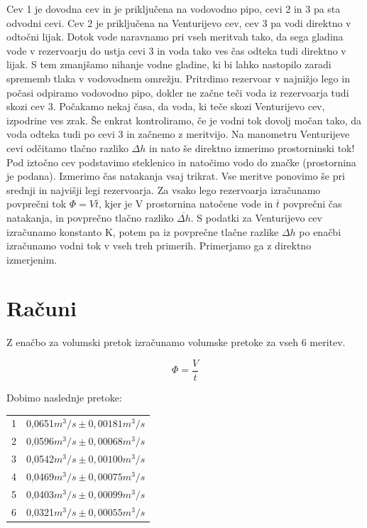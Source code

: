 \documentclass[a4paper]{report}
\begin{document}
Cev 1 je dovodna cev in je priključena na vodovodno pipo, cevi 2 in 3 pa sta odvodni cevi. Cev 2 je priključena na Venturijevo cev, cev 3 pa vodi direktno v odtočni lijak. Dotok vode naravnamo pri vseh meritvah tako, da sega gladina vode v rezervoarju do ustja cevi 3 in voda tako ves čas odteka tudi direktno v lijak. S tem zmanjšamo nihanje vodne gladine, ki bi lahko nastopilo zaradi sprememb tlaka v vodovodnem omrežju. Pritrdimo rezervoar v najnižjo lego in počasi odpiramo vodovodno pipo, dokler ne začne teči voda iz rezervoarja tudi skozi cev 3. Počakamo nekaj časa, da voda, ki teče skozi Venturijevo cev, izpodrine ves zrak. Še enkrat kontroliramo, če je vodni tok dovolj močan tako, da voda odteka tudi po cevi 3 in začnemo z meritvijo. Na manometru Venturijeve cevi odčitamo tlačno razliko $\Delta h$ in nato še direktno izmerimo prostorninski tok! Pod iztočno cev podstavimo steklenico in natočimo vodo do značke (prostornina je podana). Izmerimo čas natakanja vsaj trikrat. Vse meritve ponovimo še pri srednji in najvišji legi rezervoarja. Za vsako lego rezervoarja izračunamo povprečni tok $\Phi = V\overline{t}$, kjer je V prostornina natočene vode in $\overline{t}$ povprečni čas natakanja, in povprečno tlačno razliko $\overline{\Delta h}$. S podatki za Venturijevo cev izračunamo konstanto K, potem pa iz povprečne tlačne razlike $\Delta h$ po enačbi izračunamo vodni tok v vseh treh primerih. Primerjamo ga z direktno izmerjenim.

\chapter*{Računi}
Z enačbo za volumski pretok izračunamo volumske pretoke za vseh 6 meritev.

\[\Phi=\frac{V}{\overline{t}}\]

Dobimo naslednje pretoke:
\begin{center}
\begin{tabular}{ |c|c| } 
 \hline
 1&0,0651$m^3/s\pm0,00181m^3/s$\\
 2&0,0596$m^3/s\pm0,00068m^3/s$\\
 3&0,0542$m^3/s\pm0,00100m^3/s$\\
 4&0,0469$m^3/s\pm0,00075m^3/s$\\
 5&0,0403$m^3/s\pm0,00099m^3/s$\\
 6&0,0321$m^3/s\pm0,00055m^3/s$\\
 \hline
\end{tabular}
\end{center}
\end{document}
